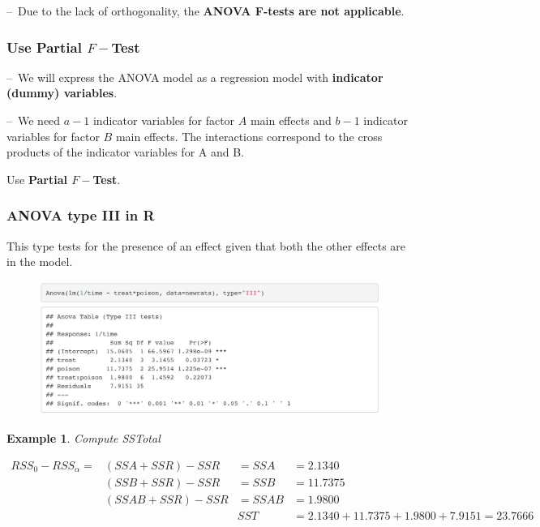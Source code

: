 \documentclass[11pt,a4paper]{article}
\newtheorem{example}{Example}
\begin{document}
–\ Due to the lack of orthogonality, the \textbf{ANOVA F-tests are not applicable}.

\subsubsection{ Use \textbf{Partial $F-$Test}}
–\ We will express the ANOVA model as a regression model with \textbf{indicator (dummy) variables}.

–\ We need $a − 1$ indicator variables for factor $A$ main effects and $b − 1$ indicator variables for factor $B$ main effects. The interactions correspond to the cross products of the indicator variables for A and B.

Use \textbf{Partial $F-$Test}.

\subsubsection{ANOVA type III in R}
This type tests for the presence of an eﬀect given that both the other eﬀects are in the model.
\begin{center}\begin{figure}[htbp]
    \centering
    \includegraphics[scale=0.3]{type3}
    \caption{}
    \label{}
\end{figure}\end{center}
\begin{example}
Compute SSTotal
\end{example}
\begin{equation}
    \begin{aligned}
        {RSS}_0-{RSS}_\alpha=&(SSA+SSR)-SSR&=SSA&=2.1340\\
        &(SSB+SSR)-SSR&=SSB&=11.7375\\
        &(SSAB+SSR)-SSR&=SSAB&=1.9800\\
        &	&SST&=2.1340+11.7375+1.9800+7.9151=23.7666
    \end{aligned}
    \nonumber
\end{equation}
\end{document}
